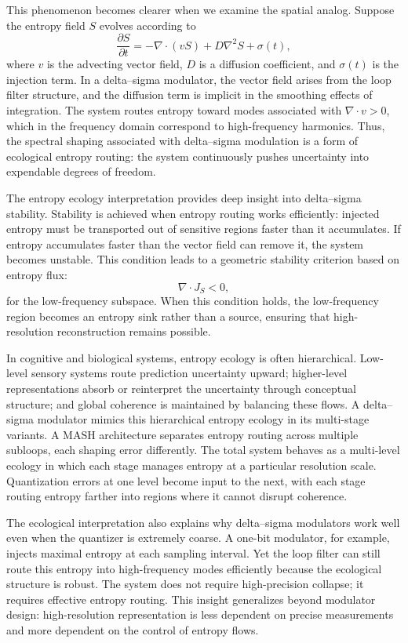 This phenomenon becomes clearer when we examine the spatial analog. Suppose the entropy field \(S\) evolves according to
\[
\frac{\partial S}{\partial t} = -\nabla \cdot (v S) + D \nabla^{2} S + \sigma(t),
\]
where \(v\) is the advecting vector field, \(D\) is a diffusion coefficient, and \(\sigma(t)\) is the injection term. In a delta–sigma modulator, the vector field arises from the loop filter structure, and the diffusion term is implicit in the smoothing effects of integration. The system routes entropy toward modes associated with \(\nabla \cdot v > 0\), which in the frequency domain correspond to high-frequency harmonics. Thus, the spectral shaping associated with delta–sigma modulation is a form of ecological entropy routing: the system continuously pushes uncertainty into expendable degrees of freedom.

The entropy ecology interpretation provides deep insight into delta–sigma stability. Stability is achieved when entropy routing works efficiently: injected entropy must be transported out of sensitive regions faster than it accumulates. If entropy accumulates faster than the vector field can remove it, the system becomes unstable. This condition leads to a geometric stability criterion based on entropy flux:
\[
\nabla \cdot J_{S} < 0,
\]
for the low-frequency subspace. When this condition holds, the low-frequency region becomes an entropy sink rather than a source, ensuring that high-resolution reconstruction remains possible.

In cognitive and biological systems, entropy ecology is often hierarchical. Low-level sensory systems route prediction uncertainty upward; higher-level representations absorb or reinterpret the uncertainty through conceptual structure; and global coherence is maintained by balancing these flows. A delta–sigma modulator mimics this hierarchical entropy ecology in its multi-stage variants. A MASH architecture separates entropy routing across multiple subloops, each shaping error differently. The total system behaves as a multi-level ecology in which each stage manages entropy at a particular resolution scale. Quantization errors at one level become input to the next, with each stage routing entropy farther into regions where it cannot disrupt coherence.

The ecological interpretation also explains why delta–sigma modulators work well even when the quantizer is extremely coarse. A one-bit modulator, for example, injects maximal entropy at each sampling interval. Yet the loop filter can still route this entropy into high-frequency modes efficiently because the ecological structure is robust. The system does not require high-precision collapse; it requires effective entropy routing. This insight generalizes beyond modulator design: high-resolution representation is less dependent on precise measurements and more dependent on the control of entropy flows.

